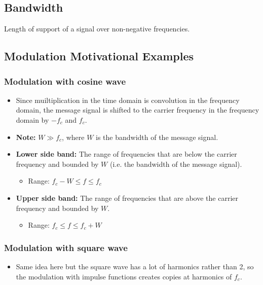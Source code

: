 \subsection{Bandwidth}
\begin{definition}
    Length of support of a signal over non-negative frequencies.
\end{definition}

\subsection{Modulation Motivational Examples}
\subsubsection{Modulation with cosine wave}
\begin{example}
    \begin{itemize}
        \item Since muiltiplication in the time domain is convolution in the frequency domain, the message signal is shifted to the carrier frequency in the frequency domain by $-f_c$ and $f_c$.
        \item \textbf{Note:} $W \gg f_c$, where $W$ is the bandwidth of the message signal.
        \item \textbf{Lower side band:} The range of frequencies that are below the carrier frequency and bounded by $W$ (i.e. the bandwidth of the message signal).
        \begin{itemize}
            \item Range: $f_c - W \leq f \leq f_c$
        \end{itemize}
        \item \textbf{Upper side band:} The range of frequencies that are above the carrier frequency and bounded by $W$.
        \begin{itemize}
            \item Range: $f_c \leq f \leq f_c + W$
        \end{itemize}
    \end{itemize}
\end{example}

\subsubsection{Modulation with square wave}
\begin{example}
    \begin{itemize}
        \item Same idea here but the square wave has a lot of harmonics rather than 2, so the modulation with impulse functions creates copies at harmonics of $f_c$. 
    \end{itemize}
\end{example}

